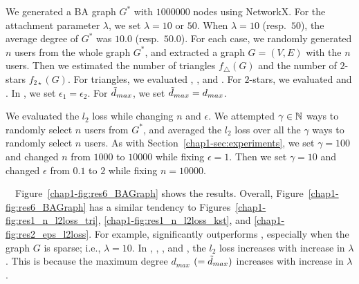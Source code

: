 We generated a BA graph $G^*$ with $1000000$ nodes using NetworkX. 
For the attachment parameter $\lambda$, we set $\lambda=10$ or $50$. 
When $\lambda=10$ (resp.~$50$), the average degree of $G^*$ was $10.0$ (resp.~$50.0$). 
For each case, we randomly generated $n$ users from the whole graph $G^*$, and extracted a graph $G=(V,E)$ with the $n$ users. 
Then we estimated the number of triangles $f_\triangle(G)$ and the number of $2$-stars $f_{2\star}(G)$. 
For triangles, we evaluated , , and . 
For $2$-stars, we evaluated  and . 
In , we set $\epsilon_1 = \epsilon_2$.
For $\tilde{d}_{max}$, we set $\tilde{d}_{max} = d_{max}$. 

We evaluated the $l_2$ loss while changing $n$ and $\epsilon$. 
We attempted $\gamma \in \mathbb{N}$ ways to randomly select $n$ users from $G^*$, and averaged the $l_2$ loss over all the $\gamma$ ways to randomly select $n$ users. 
As with Section~\ref{chap1-sec:experiments}, we set $\gamma=100$ and changed $n$ from $1000$ to $10000$ while fixing $\epsilon=1$. 
Then we set $\gamma=10$ and changed $\epsilon$ from $0.1$ to $2$ while fixing $n=10000$.

\smallskip
{}~~Figure~\ref{chap1-fig:res6_BAGraph} shows the results. 
Overall, Figure~\ref{chap1-fig:res6_BAGraph} has a similar tendency to Figures~\ref{chap1-fig:res1_n_l2loss_tri}, \ref{chap1-fig:res1_n_l2loss_kst}, and \ref{chap1-fig:res2_eps_l2loss}. 
For example,  significantly outperforms , especially when the graph $G$ is sparse; i.e., $\lambda = 10$. 
In , , , and , the $l_2$ loss increases with increase in $\lambda$. 
This is because the maximum degree $d_{max}$ $(= \tilde{d}_{max})$ increases with increase in $\lambda$.

